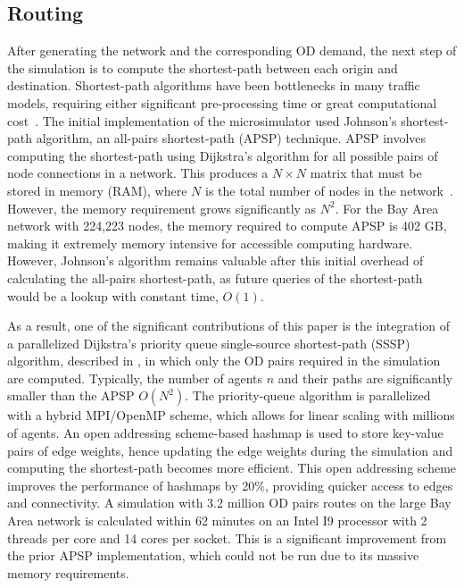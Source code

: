 \documentclass[final]{IEEEtran}
\begin{document}

\subsection{Routing}
After generating the network and the corresponding OD demand, the next step of the simulation is to compute the shortest-path between each origin and destination. Shortest-path algorithms have been bottlenecks in many traffic models, requiring either significant pre-processing time or great computational cost~\cite{dellingEngineeringRoutePlanning2009a}. The initial implementation of the microsimulator used Johnson's shortest-path algorithm, an all-pairs shortest-path (APSP) technique. APSP involves computing the shortest-path using Dijkstra's algorithm for all possible pairs of node connections in a network. This produces a $N \times N$ matrix that must be stored in memory (RAM), where $N$ is the total number of nodes in the network~\cite{garcia-doradoDesigningLargescaleInteractive2014}. However, the memory requirement grows significantly as $N^2$. For the Bay Area network with 224,223 nodes, the memory required to compute APSP is 402 GB, making it extremely memory intensive for accessible computing hardware. However, Johnson's algorithm remains valuable after this initial overhead of calculating the all-pairs shortest-path, as future queries of the shortest-path would be a lookup with constant time, $O(1)$. 

As a result, one of the significant contributions of this paper is the integration of a parallelized Dijkstra's priority queue single-source shortest-path (SSSP) algorithm, described in \cite{zhaoAgentBasedModelABM}, in which only the OD pairs required in the simulation are computed. Typically, the number of agents $n$ and their paths are significantly smaller than the APSP $O(N^2)$. The priority-queue algorithm is parallelized with a hybrid MPI/OpenMP scheme, which allows for linear scaling with millions of agents. An open addressing scheme-based hashmap is used to store key-value pairs of edge weights, hence updating the edge weights during the simulation and computing the shortest-path becomes more efficient. This open addressing scheme improves the performance of hashmaps by 20\%, providing quicker access to edges and connectivity. A simulation with 3.2 million OD pairs routes on the large Bay Area network is calculated within 62 minutes on an Intel I9 processor with 2 threads per core and 14 cores per socket. This is a significant improvement from the prior APSP implementation, which could not be run due to its massive memory requirements.
\end{document}
